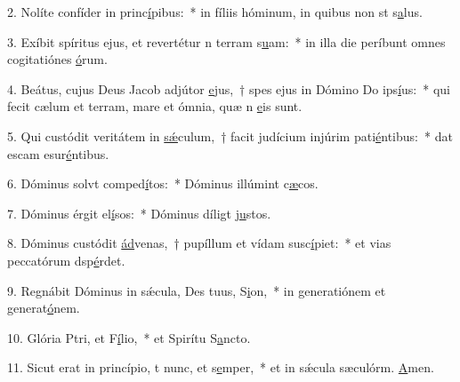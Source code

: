 2. Nolíte confíder in princ\uline{í}pibus:~* in fíliis hóminum, in quibus non st s\uline{a}lus.\par 
3. Exíbit spíritus ejus, et revertétur n terram s\uline{u}am:~* in illa die períbunt omnes cogitatiónes \uline{ó}rum.\par 
4. Beátus, cujus Deus Jacob adjútor \uline{e}jus,~† spes ejus in Dómino Do ips\uline{í}us:~* qui fecit cælum et terram, mare et ómnia, quæ n \uline{e}is sunt.\par 
5. Qui custódit veritátem in \uline{sǽ}culum,~† facit judícium injúrim pati\uline{é}ntibus:~* dat escam esur\uline{é}ntibus.\par 
6. Dóminus solvt comped\uline{í}tos:~* Dóminus illúmint c\uline{æ}cos.\par 
7. Dóminus érgit el\uline{í}sos:~* Dóminus díligt j\uline{u}stos.\par 
8. Dóminus custódit \uline{ád}venas,~† pupíllum et vídam susc\uline{í}piet:~* et vias peccatórum dsp\uline{é}rdet.\par 
9. Regnábit Dóminus in sǽcula, Des tuus, S\uline{i}on,~* in generatiónem et generat\uline{ó}nem.\par 
10. Glória Ptri, et F\uline{í}lio,~* et Spirítu S\uline{a}ncto.\par 
11. Sicut erat in princípio, t nunc, et s\uline{e}mper,~* et in sǽcula sæculórm. \uline{A}men.\par 
